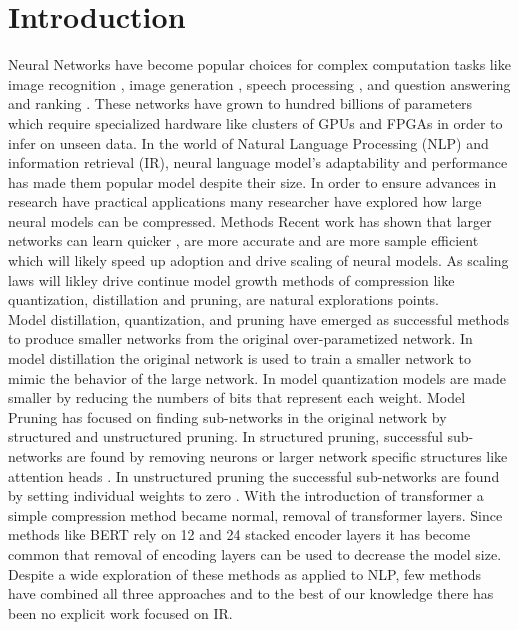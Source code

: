 \section{Introduction}
Neural Networks have become popular choices for complex computation tasks like image recognition \cite{Howard2017MobileNetsEC}, image generation \cite{Goodfellow2014GenerativeAN}, speech processing \cite{Zhao2017RecurrentCN}, and question answering \cite{Seo2017BidirectionalAF} and ranking \cite{nogueira2019multi}. These networks have grown to hundred billions of parameters \cite{Brown2020LanguageMA} which require specialized hardware like clusters of GPUs and FPGAs in order to infer on unseen data.  In the world of Natural Language Processing (NLP) and information retrieval (IR), neural language model's adaptability and performance has made them popular model despite their size. In order to ensure advances in research have practical applications many researcher have explored how large neural models can be compressed. Methods  Recent work has shown that larger networks can learn quicker \cite{Li2020TrainLT}, are more accurate and are more sample efficient \cite{Kaplan2020ScalingLF} which will likely speed up adoption and drive scaling of neural models. As scaling laws will likley drive continue model growth methods of compression like quantization, distillation and pruning, are natural explorations points.  \\ 
Model distillation, quantization, and pruning have emerged as successful methods to produce smaller networks from the original over-parametized network. In model distillation \cite{Ba2014DoDN} the original network is used to train a smaller network to mimic the behavior of the large network. In model quantization \cite{Han2016DeepCC} models are made smaller by  reducing the numbers of bits that represent each weight. Model Pruning \cite{LeCun1989OptimalBD} has focused on finding sub-networks in the original network by structured and unstructured pruning. In structured pruning, successful sub-networks are found by removing neurons  \cite{Wang2019StructuredPF} or larger network specific structures like attention heads \cite{Voita2019AnalyzingMS}. In unstructured pruning the successful sub-networks are found by setting individual weights to zero \cite{Kwon2019StructuredCB}. With the introduction of transformer \cite{Vaswani2017AttentionIA} a simple compression method became normal, removal of transformer layers. Since methods like BERT rely on 12 and 24 stacked encoder layers it has become common that removal of encoding layers can be used to decrease the model size. Despite a wide exploration of these methods as applied to NLP, few methods have combined all three approaches and to the best of our knowledge there has been no explicit work focused on IR.\\
